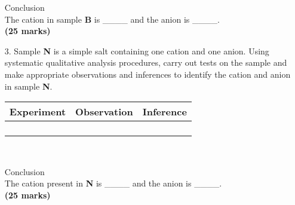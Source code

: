 \begin{enumerate}
\begin{center}
\end{center}

Conclusion\\

The cation in sample \textbf{B} is \_\_\_\_ and the anion is \_\_\_\_.\\
\raggedleft \textbf{(25 marks)}

\raggedright

\item[3.] Sample \textbf{N} is a simple salt containing one cation and one anion. Using systematic qualitative analysis procedures, carry out tests on the sample and make appropriate observations and inferences to identify the cation and anion in sample \textbf{N}.\\

\begin{center}
\begin{tabular}{|p{4cm}|p{4cm}|p{4cm}|}
\hline
\textbf{Experiment}&\textbf{Observation}&\textbf{Inference}\\ \hline
&&\\
&&\\
&&\\
&&\\
\hline
\end{tabular}\\
\end{center}

Conclusion\\

The cation present in \textbf{N} is \_\_\_\_ and the anion is \_\_\_\_.\\

\raggedleft \textbf{(25 marks)}\\

\raggedright


\end{enumerate}